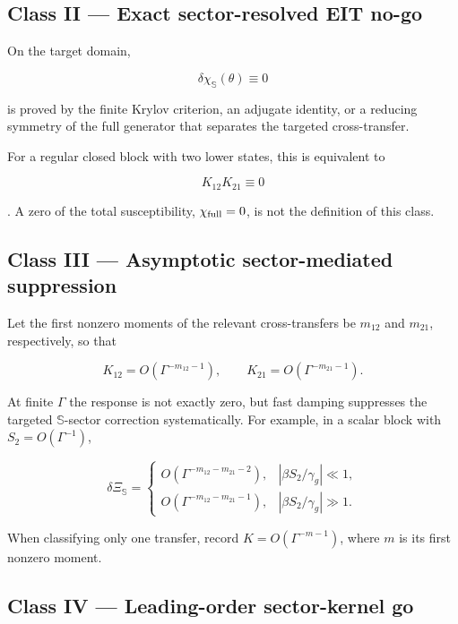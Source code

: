\documentclass[
  10pt,
  a4paper,
]{article}
\begin{document}
\subsection{Class II --- Exact sector-resolved EIT
no-go}\label{class-ii-exact-sector-resolved-eit-no-go}

On the target domain,

\[
\boxed{
\delta\chi_{\mathbb S}(\theta)\equiv0
}
\]

is proved by the finite Krylov criterion, an adjugate identity, or a
reducing symmetry of the full generator that separates the targeted
cross-transfer.

For a regular closed block with two lower states, this is equivalent to

\[
K_{12}K_{21}\equiv0
\]

. A zero of the total susceptibility, \(\chi_{\rm full}=0\), is not the
definition of this class.

\subsection{Class III --- Asymptotic sector-mediated
suppression}\label{class-iii-asymptotic-sector-mediated-suppression}

Let the first nonzero moments of the relevant cross-transfers be
\(m_{12}\) and \(m_{21}\), respectively, so that

\[
K_{12}=O(\Gamma^{-m_{12}-1}),
\qquad
K_{21}=O(\Gamma^{-m_{21}-1}).
\]

At finite \(\Gamma\) the response is not exactly zero, but fast damping
suppresses the targeted \(\mathbb S\)-sector correction systematically.
For example, in a scalar block with \(S_2=O(\Gamma^{-1})\),

\[
\delta\Xi_{\mathbb S}=
\begin{cases}
O(\Gamma^{-m_{12}-m_{21}-2}), & |\beta S_2/\gamma_g|\ll1,\\
O(\Gamma^{-m_{12}-m_{21}-1}), & |\beta S_2/\gamma_g|\gg1.
\end{cases}
\]

When classifying only one transfer, record \(K=O(\Gamma^{-m-1})\), where
\(m\) is its first nonzero moment.

\subsection{Class IV --- Leading-order sector-kernel
go}\label{class-iv-leading-order-sector-kernel-go}
\end{document}
